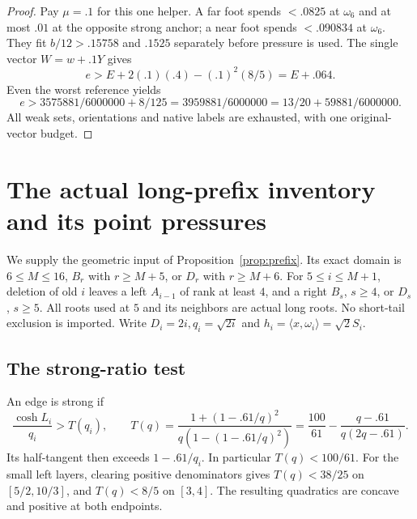 \documentclass[11pt]{article}
\theoremstyle{definition}
\theoremstyle{remark}
\newcommand{\ip}[2]{\langle #1,#2\rangle}
\begin{document}
\begin{proof}
Pay \(\mu=.1\) for this one helper.
A far foot spends \(<.0825\) at \(\omega_6\)
and at most \(.01\) at the opposite strong
anchor; a near foot spends \(<.090834\)
at \(\omega_6\).
They fit \(b/12>.15758\) and \(.1525\)
separately before pressure is used.
The single vector \(W=w+.1Y\) gives
\[
 e>E+2(.1)(.4)-(.1)^2(8/5)=E+.064.
\]
Even the worst reference yields
\[
 e>3575881/6000000+8/125
  =3959881/6000000
  =13/20+59881/6000000.
\]
All weak sets, orientations and native labels
are exhausted, with one original-vector budget.
\end{proof}


\section{The actual long-prefix inventory and its point pressures}
\label{app:prefixinventory}
We supply the geometric input of Proposition~\ref{prop:prefix}.
Its exact domain is \(6\leq M\leq16\), \(B_r\) with
\(r\geq M+5\), or \(D_r\) with \(r\geq M+6\).
For \(5\leq i\leq M+1\), deletion of old \(i\) leaves a
left \(A_{i-1}\) of rank at least \(4\), and a right
\(B_s\), \(s\geq4\), or \(D_s\), \(s\geq5\).
All roots used at \(5\) and its neighbors are actual long
roots. No short-tail exclusion is imported.
Write \(D_i=2i,q_i=\sqrt{2i}\) and
\(h_i=\ip{x}{\omega_i}=\sqrt2S_i\).

\subsection{The strong-ratio test}
An edge is strong if
\[
 \frac{\cosh L_i}{q_i}>T(q_i),\qquad
 T(q)=\frac{1+(1-.61/q)^2}{q(1-(1-.61/q)^2)}
 =\frac{100}{61}-\frac{q-.61}{q(2q-.61)}.
\]
Its half-tangent then exceeds \(1-.61/q_i\).
In particular \(T(q)<100/61\).
For the small left layers, clearing positive denominators
gives \(T(q)<38/25\) on \([5/2,10/3]\), and
\(T(q)<8/5\) on \([3,4]\). The resulting quadratics
are concave and positive at both endpoints.
\end{document}
